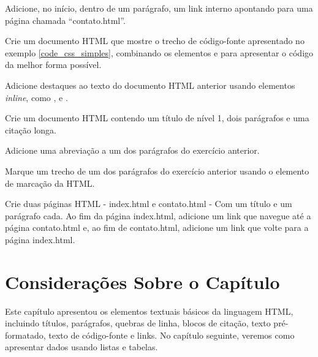\begin{exercise}
Adicione, no início, dentro de um parágrafo, um link interno apontando para uma página chamada ``contato.html''.
\end{exercise}

\begin{exercise}
Crie um documento HTML que mostre o trecho de código-fonte apresentado no exemplo \ref{code_css_simples}, combinando os elementos  e  para apresentar o código da melhor forma possível.
\end{exercise}

\begin{exercise}
Adicione destaques ao texto do documento HTML anterior usando elementos \textit{inline}, como ,  e .
\end{exercise}

\begin{exercise}
Crie um documento HTML contendo um título de nível 1, dois parágrafos e uma citação longa.
\end{exercise}

\begin{exercise}
Adicione uma abreviação a um dos parágrafos do exercício anterior.
\end{exercise}

\begin{exercise}
Marque um trecho de um dos parágrafos do exercício anterior usando o elemento de marcação da HTML.
\end{exercise}

\begin{exercise}
Crie duas páginas HTML - index.html e contato.html - Com um título e um parágrafo cada. Ao fim da página index.html, adicione um link que navegue até a página contato.html e, ao fim de contato.html, adicione um link que volte para a página index.html. 
\end{exercise}

\section{Considerações Sobre o Capítulo}

Este capítulo apresentou os elementos textuais básicos da linguagem HTML, incluindo títulos, parágrafos, quebras de linha, blocos de citação, texto pré-formatado, texto de código-fonte e links. No capítulo seguinte, veremos como apresentar dados usando listas e tabelas.